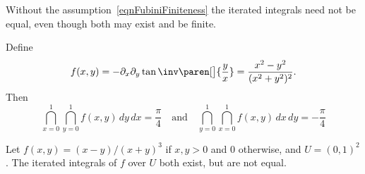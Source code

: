   Without the assumption~\eqref{eqnFubiniFiniteness} the iterated integrals need 
not be equal, even though both may exist and be finite.
  \begin{example}
    Define
    \begin{equation*}
      f(x, y)
	= -\partial_x \partial_y \tan\inv\paren[\big]{\frac{y}{x}}
	= \frac{x^2 - y^2}{(x^2 + y^2)^2}.
    \end{equation*}
    Then
    \begin{equation*}
      \dint_{x = 0}^1 \dint_{y = 0}^1 f(x, y) \, dy \, dx = \frac{\pi}{4}
      \quad\text{and}\quad
      \dint_{y = 0}^1 \dint_{x = 0}^1 f(x, y) \, dx \, dy = -\frac{\pi}{4}
    \end{equation*}
  \end{example}
  \begin{example}
    Let $f(x, y) = (x - y) / (x + y)^3$ if $x, y > 0$ and $0$ otherwise, and $U 
= (0, 1)^2$.
    The iterated integrals of $f$ over $U$ both exist, but are not equal.
  \end{example}

